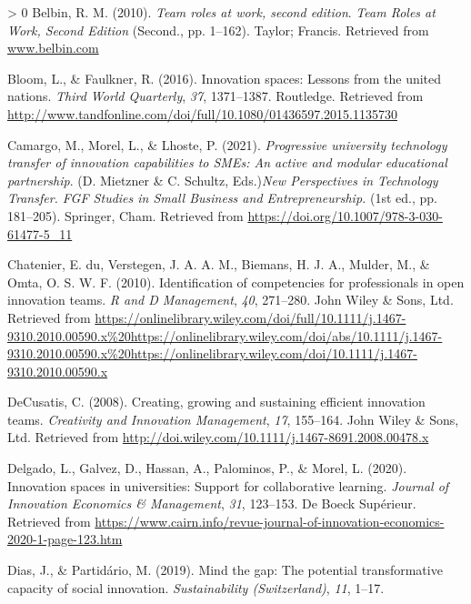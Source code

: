 \documentclass[]{elsarticle} %
\newlength{\cslhangindent}
\newenvironment{CSLReferences}[3] %
 {%
  \setlength{\parindent}{0pt}
  \ifodd #1 \everypar{\setlength{\hangindent}{\cslhangindent}}\ignorespaces\fi
  \ifnum #2 > 0
  \setlength{\parskip}{#2\baselineskip}
  \fi
 }%
 {}
\begin{document}
\hypertarget{refs}{}
\begin{CSLReferences}{1}{0}
\leavevmode\hypertarget{ref-Belbin2010}{}%
Belbin, R. M. (2010). \emph{Team roles at work, second edition}.
\emph{Team Roles at Work, Second Edition} (Second., pp. 1--162). Taylor;
Francis. Retrieved from \href{https://www.belbin.com}{www.belbin.com}

\leavevmode\hypertarget{ref-Bloom2016}{}%
Bloom, L., \& Faulkner, R. (2016). Innovation spaces: Lessons from the
united nations. \emph{Third World Quarterly}, \emph{37}, 1371--1387.
Routledge. Retrieved from
\url{http://www.tandfonline.com/doi/full/10.1080/01436597.2015.1135730}

\leavevmode\hypertarget{ref-Camargo2021}{}%
Camargo, M., Morel, L., \& Lhoste, P. (2021). \emph{Progressive
university technology transfer of innovation capabilities to SMEs: An
active and modular educational partnership}. (D. Mietzner \& C. Schultz,
Eds.)\emph{New Perspectives in Technology Transfer. FGF Studies in Small
Business and Entrepreneurship.} (1st ed., pp. 181--205). Springer, Cham.
Retrieved from \url{https://doi.org/10.1007/978-3-030-61477-5_11}

\leavevmode\hypertarget{ref-Chatenier2010}{}%
Chatenier, E. du, Verstegen, J. A. A. M., Biemans, H. J. A., Mulder, M.,
\& Omta, O. S. W. F. (2010). Identification of competencies for
professionals in open innovation teams. \emph{R and D Management},
\emph{40}, 271--280. John Wiley \& Sons, Ltd. Retrieved from
\url{https://onlinelibrary.wiley.com/doi/full/10.1111/j.1467-9310.2010.00590.x\%20https://onlinelibrary.wiley.com/doi/abs/10.1111/j.1467-9310.2010.00590.x\%20https://onlinelibrary.wiley.com/doi/10.1111/j.1467-9310.2010.00590.x}

\leavevmode\hypertarget{ref-DeCusatis2008}{}%
DeCusatis, C. (2008). Creating, growing and sustaining efficient
innovation teams. \emph{Creativity and Innovation Management},
\emph{17}, 155--164. John Wiley \& Sons, Ltd. Retrieved from
\url{http://doi.wiley.com/10.1111/j.1467-8691.2008.00478.x}

\leavevmode\hypertarget{ref-Delgado2020}{}%
Delgado, L., Galvez, D., Hassan, A., Palominos, P., \& Morel, L. (2020).
Innovation spaces in universities: Support for collaborative learning.
\emph{Journal of Innovation Economics \& Management}, \emph{31},
123--153. De Boeck Supérieur. Retrieved from
\url{https://www.cairn.info/revue-journal-of-innovation-economics-2020-1-page-123.htm}

\leavevmode\hypertarget{ref-Dias2019}{}%
Dias, J., \& Partidário, M. (2019). Mind the gap: The potential
transformative capacity of social innovation. \emph{Sustainability
(Switzerland)}, \emph{11}, 1--17.


\end{CSLReferences}
\end{document}
